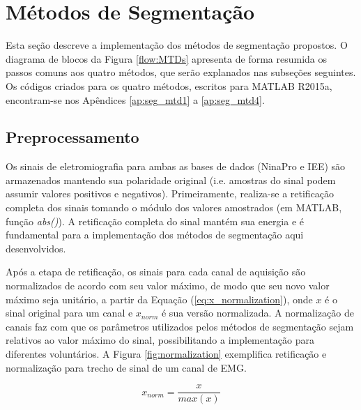 

		\section{Métodos de Segmentação}
Esta seção descreve a implementação dos métodos de segmentação propostos. O diagrama de blocos da Figura \ref{flow:MTDs} apresenta de forma resumida os passos comuns aos quatro métodos, que serão explanados nas subseções seguintes. Os códigos criados para os quatro métodos, escritos para MATLAB R2015a, encontram-se nos Apêndices \ref{ap:seg_mtd1} a \ref{ap:seg_mtd4}.



			\subsection {Preprocessamento}

Os sinais de eletromiografia para ambas as bases de dados (NinaPro e IEE) são armazenados mantendo sua polaridade original (i.e. amostras do sinal podem assumir valores positivos e negativos). Primeiramente, realiza-se a retificação completa dos sinais tomando o módulo dos valores amostrados (em MATLAB, função \emph{abs()}). A retificação completa do sinal mantém sua energia e é fundamental para a implementação dos métodos de segmentação aqui desenvolvidos.

Após a etapa de retificação, os sinais para cada canal de aquisição são normalizados de acordo com seu valor máximo, de modo que seu novo valor máximo seja unitário, a partir da Equação (\ref{eq:x_normalization}), onde $x$ é o sinal original para um canal e $x_{norm}$ é sua versão normalizada. A normalização de canais faz com que os parâmetros utilizados pelos métodos de segmentação sejam relativos ao valor máximo do sinal, possibilitando a implementação para diferentes voluntários. A Figura \ref{fig:normalization} exemplifica retificação e normalização para trecho de sinal de um canal de EMG.

\begin{equation}
	\label{eq:x_normalization}
	x_{norm} = \frac{x}{max(x)}
\end{equation}


